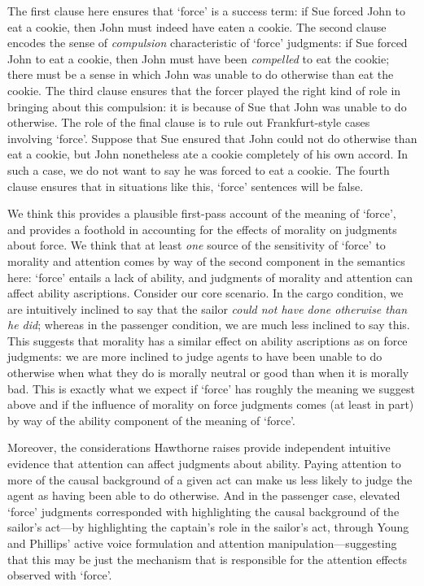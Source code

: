 \documentclass{salt}
\begin{document}
\noindent The first clause here ensures that `force' is a success term: if Sue forced John to eat a cookie, then John must indeed have eaten a cookie. The second clause encodes the sense of \emph{compulsion} characteristic of `force' judgments: if Sue forced John to eat a cookie, then John must have been \emph{compelled} to eat the cookie; there must be a sense in which John was unable to do otherwise than eat the cookie. The third clause ensures that the forcer played the right kind of role in bringing about this compulsion: it is because of Sue that John was unable to do otherwise. The role of the final clause is to rule out Frankfurt-style cases involving `force'. Suppose that Sue ensured that John could not do otherwise than eat a cookie, but John nonetheless ate a cookie completely of his own accord. In such a case, we do not want to say he was forced to eat a cookie. The fourth clause ensures that in situations like this, `force' sentences will be false.

We think this provides a plausible first-pass account of the meaning of `force', and provides a foothold in accounting for the effects of morality on judgments about force. We think that at least \emph{one} source of the sensitivity of `force' to morality and attention comes by way of the second component in the semantics here: `force' entails a lack of ability, and judgments of morality and attention can affect ability ascriptions. Consider our core scenario. In the cargo condition, we are intuitively inclined to say that the sailor \emph{could not have done otherwise than he did}; whereas in the passenger condition, we are much less inclined to say this. This suggests that morality has a similar effect on ability ascriptions as on force judgments: we are more inclined to judge agents to have been unable to do otherwise when what they do is morally neutral or good than when it is morally bad. This is exactly what we expect if `force' has roughly the meaning we suggest above and if the influence of morality on force judgments comes (at least in part) by way of the ability component of the meaning of `force'.

Moreover, the considerations Hawthorne raises provide independent intuitive evidence that attention can affect judgments about ability. Paying attention to more of the causal background of a given act can make us less likely to judge the agent as having been able to do otherwise. And in the passenger case, elevated `force' judgments corresponded with highlighting the causal background of the sailor's act---by highlighting the captain's role in the sailor's act, through Young and Phillips' active voice formulation and attention manipulation---suggesting that this may be just the mechanism that is responsible for the attention effects observed with `force'. 
\end{document}
